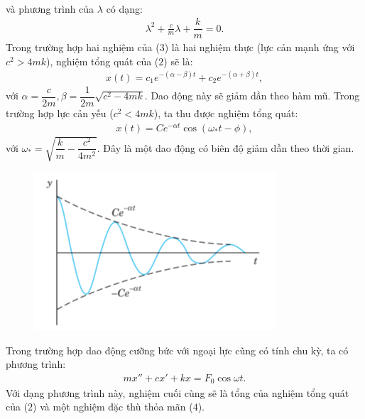\begin{multicols}{2}
\begin{align*}
	\end{align*}
	và phương trình của $\lambda$ có dạng:
	\begin{align*}
		\lambda^2 + \frac{c}{m} \lambda + \dfrac{k}{m} = 0. \tag{$3$}
	\end{align*}
	Trong trường hợp hai nghiệm của ($3$) là hai nghiệm thực (lực cản mạnh ứng với $c^2>4mk$), nghiệm tổng quát của ($2$) sẽ là:
	\begin{align*}
		x(t) = c_1e^{-(\alpha-\beta)t}+ c_2e^{-(\alpha + \beta)t},
	\end{align*}
	với $\alpha = \dfrac{c}{2m}, \beta = \dfrac{1}{2m}\sqrt{c^2 - 4mk}$.
	\vskip 0.1cm
	Dao động này sẽ giảm dần theo hàm mũ.
	\vskip 0.1cm
	Trong trường hợp lực cản yếu ($c^2<4mk$), ta thu được nghiệm tổng quát:
	\begin{align*}
		x(t) = Ce^{-\alpha t}\cos(\omega_*t - \phi),
	\end{align*}
	với $\omega_* = \sqrt{\dfrac{k}{m} - \dfrac{c^2}{4m^2}}$.
	\vskip 0.1cm
	Đây là một dao động có biên độ giảm dần theo thời gian.
	\begin{figure}[H]
		\centering
		\vspace*{-5pt}
		\captionsetup{labelformat= empty, justification=centering}
		\includegraphics[width=1\linewidth]{12}
		\vspace*{-15pt}
	\end{figure}
	Trong trường hợp dao động cưỡng bức với ngoại lực cũng có tính chu kỳ, ta có phương trình:
	\begin{align*}
		mx'' + cx' + kx = F_0\cos \omega t. \tag{$4$}
	\end{align*}
	Với dạng phương trình này, nghiệm cuối cùng sẽ là tổng của nghiệm tổng quát của ($2$) và một nghiệm đặc thù thỏa mãn ($4$).

\end{multicols}
